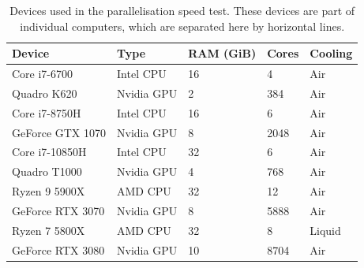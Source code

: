 \documentclass{jors}
\begin{document}
		\begin{table}[h!]
			\caption{Devices used in the parallelisation speed test.
			These devices are part of individual computers, which are separated here by horizontal lines.}
			\label{tab:devices}
			\begin{tabular}{l|l|l|l|l}
				\textbf{Device}	&\textbf{Type}	&\textbf{RAM (GiB)}	&\textbf{Cores}	&\textbf{Cooling}\\
				\hline
				Core i7-6700	&Intel CPU		&16					&4				&Air\\
				Quadro K620		&Nvidia GPU		&2					&384			&Air\\
				\hline
				Core i7-8750H	&Intel CPU		&16					&6				&Air\\
				GeForce GTX 1070&Nvidia GPU		&8					&2048			&Air\\
				\hline
				Core i7-10850H	&Intel CPU		&32					&6				&Air\\
				Quadro T1000	&Nvidia GPU		&4					&768			&Air\\
				\hline
				Ryzen 9 5900X	&AMD CPU		&32					&12				&Air\\
				GeForce RTX 3070&Nvidia GPU		&8					&5888			&Air\\
				\hline
				Ryzen 7 5800X	&AMD CPU		&32					&8				&Liquid\\
				GeForce RTX 3080&Nvidia GPU		&10					&8704			&Air\\
			\end{tabular}
		\end{table}
\end{document}
